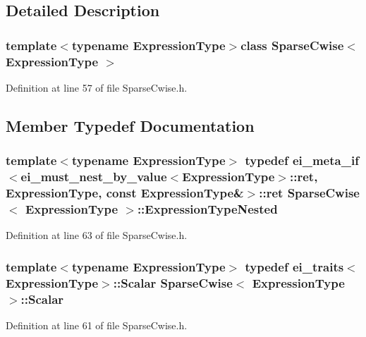 \subsection{Detailed Description}
\subsubsection*{template$<$typename Expression\-Type$>$class Sparse\-Cwise$<$ Expression\-Type $>$}



Definition at line 57 of file Sparse\-Cwise.\-h.



\subsection{Member Typedef Documentation}
\hypertarget{class_sparse_cwise_ae603d2da5a5b74a3adb93a21b4aa8c1e}{
\subsubsection[{Expression\-Type\-Nested}]{\setlength{\rightskip}{0pt plus 5cm}template$<$typename Expression\-Type$>$ typedef {\bf ei\-\_\-meta\-\_\-if}$<${\bf ei\-\_\-must\-\_\-nest\-\_\-by\-\_\-value}$<$Expression\-Type$>$\-::{\bf ret}, Expression\-Type, const Expression\-Type\&$>$\-::{\bf ret} {\bf Sparse\-Cwise}$<$ Expression\-Type $>$\-::{\bf Expression\-Type\-Nested}}}\label{class_sparse_cwise_ae603d2da5a5b74a3adb93a21b4aa8c1e}


Definition at line 63 of file Sparse\-Cwise.\-h.

\hypertarget{class_sparse_cwise_ad74c0517fbc31c6ef82186ae79723bea}{
\subsubsection[{Scalar}]{\setlength{\rightskip}{0pt plus 5cm}template$<$typename Expression\-Type$>$ typedef {\bf ei\-\_\-traits}$<$Expression\-Type$>$\-::{\bf Scalar} {\bf Sparse\-Cwise}$<$ Expression\-Type $>$\-::{\bf Scalar}}}\label{class_sparse_cwise_ad74c0517fbc31c6ef82186ae79723bea}


Definition at line 61 of file Sparse\-Cwise.\-h.

